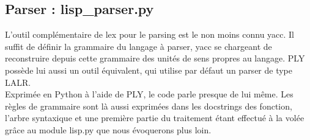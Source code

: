 \documentclass{article}
\begin{document}
\subsection{Parser : lisp\_parser.py}
L'outil complémentaire de lex pour le parsing est le non moins connu yacc. 
Il suffit de définir la grammaire du langage à parser, yacc se chargeant de reconstruire 
depuis cette grammaire des unités de sens propres au langage. 
PLY possède lui aussi un outil équivalent, qui utilise par défaut un parser
de type LALR.
\\
Exprimée en Python à l'aide de PLY, le code parle presque de lui même.
Les règles de grammaire sont là aussi exprimées dans les docstrings des fonction, 
l'arbre syntaxique et une première partie du traitement étant effectué à la volée grâce au module lisp.py
que nous évoquerons plus loin.
\end{document}
